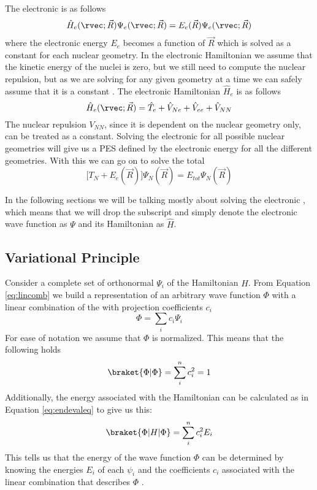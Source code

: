 \documentclass[../master_thesis.tex]{subfiles}
\begin{document}
The electronic \SE is as follows
\begin{equation}
    \hat{H}_e(\rvec; \vec{R}) \Psi_e(\rvec;\vec{R}) = E_e(\vec{R})\Psi_e(\rvec;\vec{R})
\end{equation}
where the electronic energy $E_e$ becomes a function of $\vec{R}$ which is solved as
a constant for each nuclear geometry. In the electronic Hamiltonian
we assume that the kinetic energy of the nuclei is zero, but we still need to
compute the nuclear repulsion, but as we are solving for any given geometry at a time
we can safely assume that it is a constant \cite{Cramer:2004}. The electronic
Hamiltonian $\hat{H}_e$ is as follows
\begin{equation}\label{eq:elhamiltonian}
    \hat{H}_e(\rvec; \vec{R}) = \hat{T}_e + \hat{V}_{Ne} + \hat{V}_{ee}  + \hat{V}_{NN}
\end{equation}
The nuclear repulsion $V_{NN}$, since it is dependent on the nuclear geometry only,
can be treated as a constant.
Solving the electronic \SE for all possible nuclear geometries will give us
a \ac{PES} defined by the electronic energy for all the different geometries.
With this we can go on to solve the total \SE \cite{Jensen:2017}
\begin{equation}
  \Big[T_N + E_e(\vec{R})\Big]\Psi_N(\vec{R}) = E_{tot}\Psi_N(\vec{R})
\end{equation}

In the following sections we will be talking mostly about solving the electronic \SE,
which means that we will drop the subscript and simply denote the electronic
wave function as $\Psi$ and its Hamiltonian as $\hat{H}$.

\subsection{Variational Principle}
Consider a complete set of orthonormal \eifuncs $ \Psi_i$  of the
Hamiltonian $\hat{H}$. From Equation \ref{eq:lincomb} we build a representation of an
arbitrary wave function $\Phi$ with a linear combination of the \eifuncs with
projection coefficients $c_i$
\begin{equation}
  \Phi = \sum\limits_ic_i\Psi_i
\end{equation}
For ease of notation we assume that $\Phi$ is normalized. This means that the
following holds
\begin{equation}
  \braket{\Phi|\Phi} = \sum\limits_i^nc_i^2 = 1
\end{equation}
Additionally, the energy associated with the Hamiltonian can
be calculated as in Equation \ref{eq:endevaleq} to give us this:
\begin{equation}
  \braket{\Phi|H|\Phi} = \sum\limits_i^nc_i^2E_i\label{eq:genenerg}
\end{equation}
This tells us that the energy of the wave function $\Phi$ can be determined by
knowing the energies $E_i$ of each \eifunc $\psi_i$ and the coefficients
$c_i$ associated with the linear combination that describes $\Phi$
\cite{Cramer:2004}.
\end{document}
